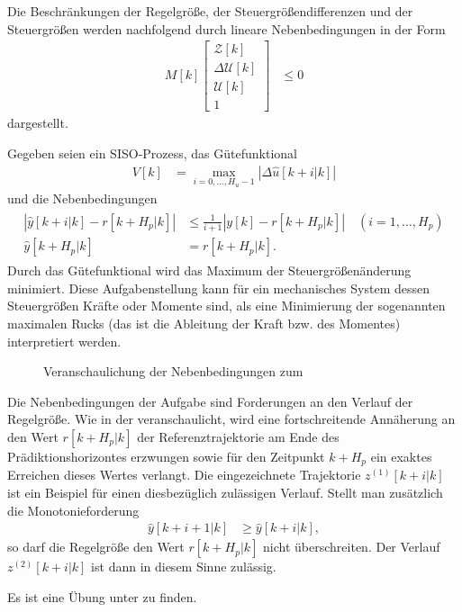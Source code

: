 Die Beschränkungen der Regelgröße, der Steuergrößendifferenzen und der Steuergrößen werden nachfolgend durch lineare Nebenbedingungen in der Form
\begin{align}
M[k]\begin{bmatrix}
\mathcal{Z}[k]\\ \Delta\mathcal{U}[k]\\ \mathcal{U}[k]\\ 1
\end{bmatrix} & \le 0\label{eqn:kap_4_lin_nebenbedingungen}
\end{align}
dargestellt.
\begin{exmp}
Gegeben seien ein \ac{SISO}-Prozess, das Gütefunktional
\begin{align*}
	V[k] & = \max\limits_{i=0,\ldots,H_u-1}\left|\Delta\hat{u}[k+i|k] \right|
\end{align*}
und die Nebenbedingungen
\begin{align}
\begin{split}\label{ref:eqn:kap_4_bsp_1_nebenbedingungen}
	\left|\hat{y}[k+i|k]-r[k+H_p|k] \right| & \le \frac{1}{i+1}\left| y[k] - r[k+H_p|k] \right|\quad (i=1,\ldots,H_p)\\
	\hat{y}[k+H_p|k] & = r[k+H_p|k].
\end{split}
\end{align}
Durch das Gütefunktional wird das Maximum der Steuergrößenänderung minimiert. Diese Aufgabenstellung kann für ein mechanisches System dessen Steuergrößen Kräfte oder Momente sind, als
eine Minimierung der sogenannten maximalen Rucks (das ist die Ableitung der Kraft bzw. des Momentes) interpretiert werden.
\begin{figure}[htb]
	\centering
	
	\caption{Veranschaulichung der Nebenbedingungen zum }
	\label{fig:kap_4_bsp_nebenbedingungen}
\end{figure}
Die Nebenbedingungen der Aufgabe sind Forderungen an den Verlauf der Regelgröße. Wie in der  veranschaulicht, wird eine fortschreitende Annäherung
an den Wert $r[k+H_p|k]$ der Referenztrajektorie am Ende des Prädiktionshorizontes erzwungen sowie für den Zeitpunkt $k+H_p$ ein exaktes Erreichen dieses Wertes verlangt. Die
eingezeichnete Trajektorie $z^{(1)}[k+i|k]$ ist ein Beispiel für einen diesbezüglich zulässigen Verlauf. Stellt man zusätzlich die Monotonieforderung
\begin{align}
	\hat{y}[k+i+1|k] & \ge \hat{y}[k+i|k],
\end{align}
so darf die Regelgröße den Wert $r[k+H_p|k]$ nicht überschreiten. Der Verlauf $z^{(2)}[k+i|k]$ ist dann in diesem Sinne zulässig.
\end{exmp}
Es ist eine Übung unter  zu finden.

